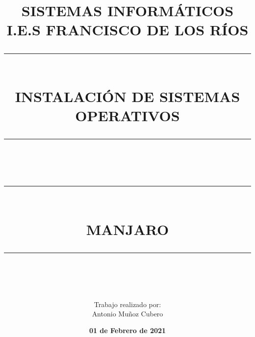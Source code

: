 \documentclass[12pt]{article}
\newcommand{\HRule}[1]{\rule{\linewidth}{#1}}
\begin{document}
\title{ \normalsize \textsc{SISTEMAS INFORMÁTICOS\\
I.E.S FRANCISCO DE LOS RÍOS}
		\\ [2.0cm]
		\HRule{0.5pt} \\
		\LARGE \textbf{\uppercase{Instalación de Sistemas Operativos}}
    \HRule{0.5pt} \\
    \HRule{2pt} \\ [0.5cm]
    \LARGE \textbf{\uppercase{MANJARO}}
    \HRule{2pt} \\ [0.5cm]
    \normalsize  \vspace*{2\baselineskip}
    }

\author{
        Trabajo realizado por: \\
		Antonio Muñoz Cubero
	    \normalsize  \vspace*{4\baselineskip}
		}
\date{\textbf{01 de Febrero de 2021}}
\newpage
\maketitle
\newpage

\tableofcontents
\newpage

\sectionfont{\scshape}






\end{document}
